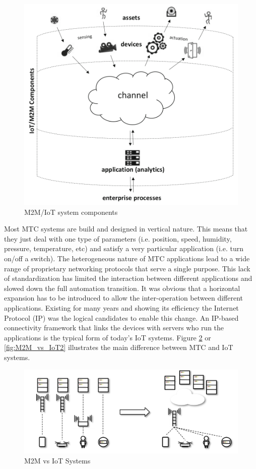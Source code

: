 \documentclass[conference]{IEEEtran}
\begin{document}
\begin{figure}
\centerline{\includegraphics[width=\linewidth]{Pictures/IoT Components.png}}
\caption{M2M/IoT system components}
\label{fig:IoT_components}
\end{figure}


Most MTC systems are build and designed in vertical nature. This means that they just deal with one type of parameters (i.e. position, speed, humidity, pressure, temperature, etc) and satisfy a very particular application (i.e. turn on/off a switch). The heterogeneous nature of MTC applications lead to a wide range of proprietary networking protocols that serve a single purpose. This lack of standardization has limited the interaction between different applications and slowed down the full automation transition. It was obvious that a horizontal expansion has to be introduced to allow the inter-operation between different applications. Existing for many years and showing its efficiency the Internet Protocol (IP) was the logical candidates to enable this change. An IP-based connectivity framework that links the devices with servers who run the applications is the typical form of today's IoT systems. Figure \ref{fig:M2M_vs_IoT} or \ref{fig:M2M_vs_IoT2} illustrates the main difference between MTC and IoT systems.
\begin{figure}
\centerline{\includegraphics[width=\linewidth]{Pictures/M2M to IoT.png}}
\caption{M2M vs IoT Systems}
\label{fig:M2M_vs_IoT}
\end{figure}
\end{document}
